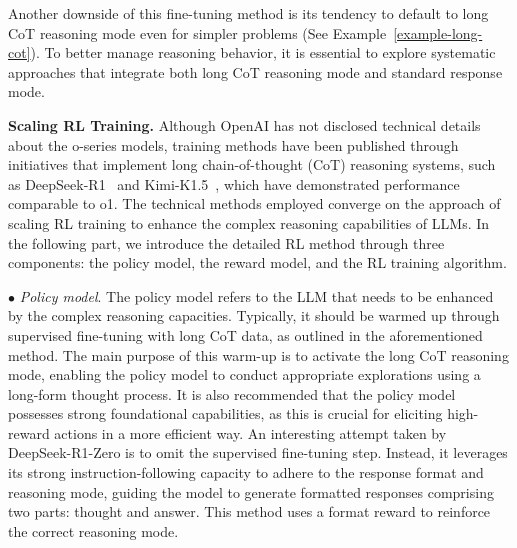 Another downside of this fine-tuning method is its tendency to default to long CoT reasoning mode even for simpler problems (See Example~\ref{example-long-cot}). To better manage reasoning behavior, it is essential to explore systematic approaches that integrate both long CoT reasoning mode and standard response mode.

\textbf{Scaling RL Training.} Although OpenAI has not disclosed technical details about the o-series models, training methods have been published through initiatives that implement long chain-of-thought (CoT) reasoning systems, such as DeepSeek-R1~\cite{Deepseek-arxiv-2025-DeepSeek} and Kimi-K1.5~\cite{Kimi-arxiv-2025-Kimi}, which have demonstrated performance comparable to o1. The technical methods employed converge on the approach of scaling RL training to enhance the complex reasoning capabilities of LLMs. In the following part, we introduce the detailed RL method through three components: the policy model, the reward model, and the RL training algorithm. 

$\bullet$ \emph{ Policy model}. The policy model refers to the LLM that needs to be enhanced by the complex reasoning capacities. Typically, it should be warmed up through supervised fine-tuning with long CoT data, as outlined in the aforementioned method. The main purpose of this warm-up is to activate the long CoT reasoning mode, enabling the policy model to conduct appropriate explorations using a long-form thought process. It is also recommended that the policy model possesses strong foundational capabilities, as this is crucial for eliciting high-reward actions in a more efficient way. An interesting attempt taken by DeepSeek-R1-Zero is to omit the supervised fine-tuning step. Instead, it leverages its strong instruction-following capacity to  adhere to the response format and reasoning mode, guiding the model to generate formatted responses comprising two parts: thought and answer. This method uses a format reward to reinforce the correct reasoning mode.  

